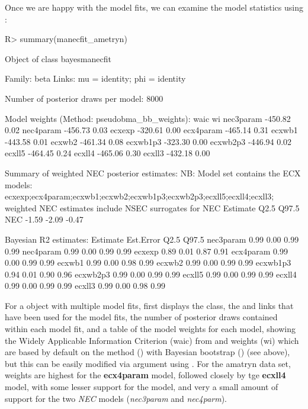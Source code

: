 \documentclass[
  shortnames]{jss}
\begin{document}
Once we are happy with the model fits, we can examine the model statistics using :

\begin{CodeChunk}
\begin{CodeInput}
R> summary(manecfit_ametryn)
\end{CodeInput}
\begin{CodeOutput}
Object of class bayesmanecfit

 Family: beta  
  Links: mu = identity; phi = identity  

Number of posterior draws per model:  8000

Model weights (Method: pseudobma_bb_weights):
             waic   wi
nec3param -450.82 0.02
nec4param -456.73 0.03
ecxexp    -320.61 0.00
ecx4param -465.14 0.31
ecxwb1    -443.58 0.01
ecxwb2    -461.34 0.08
ecxwb1p3  -323.30 0.00
ecxwb2p3  -446.94 0.02
ecxll5    -464.45 0.24
ecxll4    -465.06 0.30
ecxll3    -432.18 0.00


Summary of weighted NEC posterior estimates:
NB: Model set contains the ECX models: ecxexp;ecx4param;ecxwb1;ecxwb2;ecxwb1p3;ecxwb2p3;ecxll5;ecxll4;ecxll3; weighted NEC estimates include NSEC surrogates for NEC
    Estimate  Q2.5 Q97.5
NEC    -1.59 -2.09 -0.47


Bayesian R2 estimates:
          Estimate Est.Error Q2.5 Q97.5
nec3param     0.99      0.00 0.99  0.99
nec4param     0.99      0.00 0.99  0.99
ecxexp        0.89      0.01 0.87  0.91
ecx4param     0.99      0.00 0.99  0.99
ecxwb1        0.99      0.00 0.98  0.99
ecxwb2        0.99      0.00 0.99  0.99
ecxwb1p3      0.94      0.01 0.90  0.96
ecxwb2p3      0.99      0.00 0.99  0.99
ecxll5        0.99      0.00 0.99  0.99
ecxll4        0.99      0.00 0.99  0.99
ecxll3        0.99      0.00 0.98  0.99
\end{CodeOutput}
\end{CodeChunk}

For a  object with multiple model fits,  first displays the class, the  and links that have been used for the model fits, the number of posterior draws contained within each model fit, and a table of the model weights for each model, showing the Widely Applicable Information Criterion (waic)\citep{watanabe2010asymptotic} from  and weights (wi) which are based by default on the  method () with Bayesian bootstrap () (see above), but this can be easily modified via argument  using . For the amatryn data set, weights are highest for the \textbf{ecx4param} model, followed closely by tge \textbf{ecxll4} model, with some lesser support for the  model, and very a small amount of support for the two \emph{NEC} models (\emph{nec3param} and \emph{nec4parm}).
\end{document}
